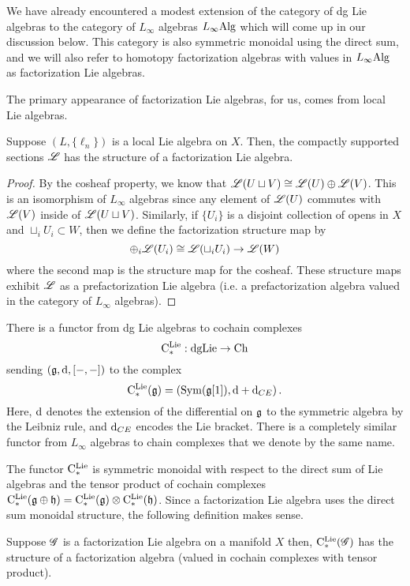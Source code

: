 \documentclass[10pt]{amsart}
\begin{document}
We have already encountered a modest extension of the category of dg Lie algebras to the category of $L_\infty$ algebras $L_\infty{\rm Alg}$ which will come up in our discussion below.
This category is also symmetric monoidal using the direct sum, and we will also refer to homotopy factorization algebras with values in $L_\infty{\rm Alg}$ as factorization Lie algebras.

The primary appearance of factorization Lie algebras, for us, comes from local Lie algebras.
 
\begin{lem}
Suppose $(L, \{\ell_n\})$ is a local Lie algebra on $X$.
Then, the compactly supported sections $\mathscr L$ has the structure of a factorization Lie algebra.
\end{lem}
\begin{proof}
By the cosheaf property, we know that $\mathscr L(U \sqcup V) \cong \mathscr L(U) \oplus \mathscr L(V)$. 
This is an isomorphism of $L_\infty$ algebras since any element of $\mathscr L(U)$ commutes with $\mathscr L(V)$ inside of $\mathscr L(U \sqcup V)$. 
Similarly, if $\{U_i\}$ is a disjoint collection of opens in $X$ and $\sqcup_i U_i \subset W$, then we define the factorization structure map by
\[
\oplus_i \mathscr L(U_i) \cong \mathscr L(\sqcup_i U_i) \to \mathscr L (W)
\]
where the second map is the structure map for the cosheaf. 
These structure maps exhibit $\mathscr L$ as a prefactorization Lie algebra (i.e. a prefactorization algebra valued in the category of $L_\infty$ algebras). 
\end{proof}

There is a functor from dg Lie algebras to cochain complexes 
\[
{\rm C}^{\rm Lie}_* : {\rm dgLie} \to {\rm Ch}
\]
sending $(\mathfrak g, {\rm d} , [-,-])$ to the complex
\[
{\rm C}^{\rm Lie}_* (\mathfrak g) = \left({\rm Sym}(\mathfrak g[1]), {\rm d} + {\rm d}_{CE}\right) .
\]
Here, ${\rm d}$ denotes the extension of the differential on $\mathfrak g$ to the symmetric algebra by the Leibniz rule, and ${\rm d}_{CE}$ encodes the Lie bracket.
There is a completely similar functor from $L_\infty$ algebras to chain complexes that we denote by the same name.

The functor ${\rm C}^{\rm Lie}_*$ is symmetric monoidal with respect to the direct sum of Lie algebras and the tensor product of cochain complexes ${\rm C}^{\rm Lie}_*(\mathfrak g \oplus \mathfrak h) = {\rm C}^{\rm Lie}_*(\mathfrak g) \otimes {\rm C}^{\rm Lie}_*(\mathfrak h)$. 
Since a factorization Lie algebra uses the direct sum monoidal structure, the following definition makes sense.

\begin{dfn/lem}
Suppose $\mathscr G$ is a factorization Lie algebra on a manifold $X$ then, ${\rm C}^{\rm Lie}_*(\mathscr G)$ has the structure of a factorization algebra (valued in cochain complexes with tensor product). 
\end{dfn/lem}
\end{document}
